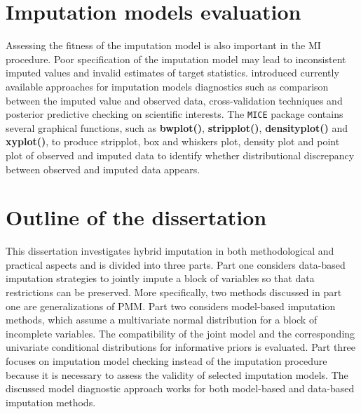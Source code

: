\section{Imputation models evaluation}
Assessing the fitness of the imputation model is also important in the MI procedure. Poor specification of the imputation model may lead to inconsistent imputed values and invalid estimates of target statistics. \citet{nguyen2017model} introduced currently available approaches for imputation models diagnostics such as comparison between the imputed value and observed data, cross-validation techniques and posterior predictive checking on scientific interests. The \texttt{MICE} package contains several graphical functions, such as \textbf{bwplot()}, \textbf{stripplot()}, \textbf{densityplot()} and \textbf{xyplot()}, to produce stripplot, box and whiskers plot, density plot and point plot of observed and imputed data to identify whether distributional discrepancy between observed and imputed data appears. 

\section{Outline of the dissertation}
This dissertation investigates hybrid imputation in both methodological and practical aspects and is divided into three parts. Part one considers data-based imputation strategies to jointly impute a block of variables so that data restrictions can be preserved. More specifically, two methods discussed in part one are generalizations of PMM. Part two considers model-based imputation methods, which assume a multivariate normal distribution for a block of incomplete variables. The compatibility of the joint model and the corresponding univariate conditional distributions for informative priors is evaluated. Part three focuses on imputation model checking instead of the imputation procedure because it is necessary to assess the validity of selected imputation models. The discussed model diagnostic approach works for both model-based and data-based imputation methods.  
